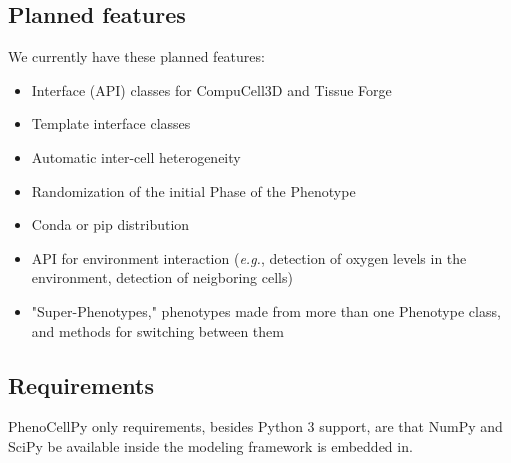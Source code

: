 

\subsection{Planned features}
We currently have these planned features:
\begin{itemize}\setlength\itemsep{.01em}
    \item Interface (API) classes for CompuCell3D and Tissue Forge
    \item Template interface classes
    \item Automatic inter-cell heterogeneity~\cite{ferrari_gianlupi_multiscale_2022}
    \item Randomization of the initial Phase of the Phenotype
    \item Conda or pip distribution
    \item API for environment interaction (\textit{e.g.}, detection of oxygen levels in the environment, detection of neigboring cells)
    \item "Super-Phenotypes," phenotypes made from more than one Phenotype class, and methods for switching between them
\end{itemize}

\subsection{Requirements}
PhenoCellPy only requirements, besides Python 3 support, are that NumPy and SciPy be available inside the modeling framework \pcp is embedded in.




